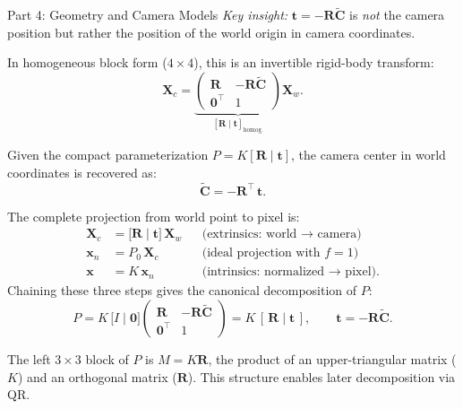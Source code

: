 \documentclass[letterpaper]{article}
\begin{document}
\begin{notes}{Part 4: Geometry and Camera Models}
\textit{Key insight:} $\mathbf{t} = -\mathbf{R}\widetilde{\mathbf{C}}$
is \emph{not} the camera position but rather the position of the world
origin in camera coordinates.

In homogeneous block form ($4\times 4$), this is an invertible rigid-body
transform:
\begin{equation}
  \mathbf{X}_c
  = \underbrace{\begin{pmatrix} \mathbf{R} & -\mathbf{R}\widetilde{\mathbf{C}} \\
                  \mathbf{0}^\top & 1 \end{pmatrix}}_{[\mathbf{R}\mid\mathbf{t}]_{\text{homog.}}}
    \mathbf{X}_w.
\end{equation}


Given the compact parameterization $P = K[\mathbf{R}\mid\mathbf{t}]$,
the camera center in world coordinates is recovered as:
\begin{equation}
  \widetilde{\mathbf{C}} = -\mathbf{R}^\top\,\mathbf{t}.
\end{equation}



The complete projection from world point to pixel is:
\begin{align}
  \mathbf{X}_c &= \bigl[\mathbf{R}\mid\mathbf{t}\bigr]\,\mathbf{X}_w
    & &\text{(extrinsics: world $\to$ camera)} \\
  \mathbf{x}_n &= P_0\,\mathbf{X}_c
    & &\text{(ideal projection with }f=1\text{)} \\
  \mathbf{x}   &= K\,\mathbf{x}_n
    & &\text{(intrinsics: normalized $\to$ pixel).}
\end{align}
Chaining these three steps gives the canonical decomposition of $P$:
\begin{equation}
  \boxed{
    P = K\,\bigl[I \mid \mathbf{0}\bigr]
        \begin{pmatrix} \mathbf{R} & -\mathbf{R}\widetilde{\mathbf{C}} \\
                        \mathbf{0}^\top & 1 \end{pmatrix}
      = K\,[\,\mathbf{R} \mid \mathbf{t}\,],
    \qquad \mathbf{t} = -\mathbf{R}\widetilde{\mathbf{C}}.
  }
\end{equation}

The left $3\times 3$ block of $P$ is $M = K\mathbf{R}$, the product of
an upper-triangular matrix ($K$) and an orthogonal matrix ($\mathbf{R}$).
This structure enables later decomposition via QR.


\end{notes}
\end{document}
